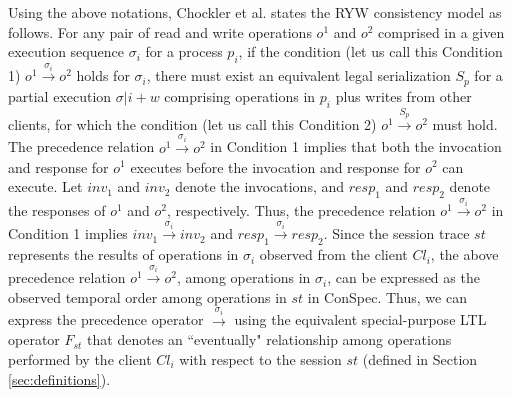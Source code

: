 \documentclass[acmlarge, ,11pt]{acmart}
\begin{document}
  \par Using the above notations, Chockler et al. states the RYW consistency model as follows.  For any pair of read and write operations $\mathit{o}^1$ and $\mathit{o}^2$ comprised in a given execution sequence $\sigma_i$ for a process $p_i$, if the condition  (let us call this Condition 1)
     $\mathit{o}^1 \xrightarrow{\sigma_i} \mathit{o}^2$ holds for $\sigma_i$, there must exist an equivalent legal serialization ${S_p}$ for a partial execution  $\sigma |i + w$ comprising
   operations in $p_i$ plus writes from other clients, for which the condition (let us call this Condition 2)
  $\mathit{o}^1 \xrightarrow{S_p} \mathit{o}^2$ must hold. %
  The precedence relation  $\mathit{o}^1 \xrightarrow{\sigma_i} \mathit{o}^2$ %
   in  Condition 1  implies that  both the  invocation and response for $\mathit{o}^1$ executes before the invocation and response for $\mathit{o}^2$ can execute. Let $\mathit{inv}_1$ and  $\mathit{inv}_2$ denote the invocations, and $\mathit{resp}_1$ and  $\mathit{resp}_2$ denote the responses  of  $\mathit{o}^1$ and
 $\mathit{o}^2$, respectively.  Thus, the precedence relation $ \mathit{o}^1 \xrightarrow{\sigma_i} \mathit{o}^2 $ in Condition 1  implies $ \mathit{inv}_1 \xrightarrow{\sigma_i} \mathit{inv}_2 $ and $ \mathit{resp}_1 \xrightarrow{\sigma_i} \mathit{resp}_2 $.
  Since the session trace $\mathit{st}$ represents the results of operations in $\sigma_i$ observed from the client $\mathit{Cl}_i$,  the above precedence  relation $ \mathit{o}^1 \xrightarrow{\sigma_i} \mathit{o}^2 $, among operations in $\sigma_i$, can be expressed as the observed temporal order  among operations in $\mathit{st}$ in ConSpec.  Thus, we can express the precedence  operator $\xrightarrow{\sigma_i}$ using the
 equivalent special-purpose LTL operator $F_\mathit{st}$ that denotes an ``eventually" relationship  among operations performed by the client $\mathit{Cl}_i$ with respect to the session $\mathit{st}$ (defined in Section \ref{sec:definitions}).  %
\end{document}

